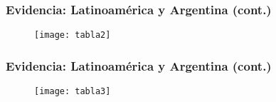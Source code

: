 \documentclass[handout,final,xcolor=dvipsnames]{beamer}
\begin{document}
\begin{frame}\frametitle{Evidencia: Latinoamérica y Argentina (cont.)}
\begin{figure}[htbp]
    \centering
    \texttt{[image: tabla2]}
  \end{figure}
\end{frame}


\begin{frame}\frametitle{Evidencia: Latinoamérica y Argentina (cont.)}
\begin{figure}[htbp]
    \centering
    \texttt{[image: tabla3]}
  \end{figure}
\end{frame}
\end{document}
